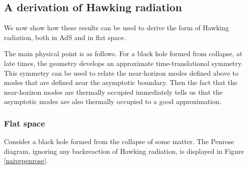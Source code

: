 \documentclass[12pt]{article}
\begin{document}
\subsection{A derivation of Hawking radiation \label{hawkingderiv}}
We now show how these results can be used to derive the form of Hawking radiation, both in AdS and in flat space.

The main physical point is as follows.  For a black hole formed from collapse, at late times, the geometry develops an approximate time-translational symmetry. This symmetry can be used to relate the near-horizon modes defined above to modes that are defined near the asymptotic boundary.  Then the fact that the near-horizon modes are thermally occupied immediately tells us that the asymptotic modes are also thermally occupied to a good approximation.



\subsubsection{Flat space \label{secflathawkingrad}}
Consider a black hole formed from the collapse of some matter. The Penrose diagram, ignoring any backreaction of Hawking radiation, is displayed in Figure \ref{naivepenrose}.
\end{document}
